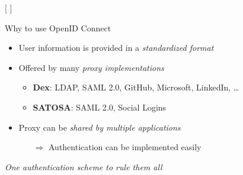 \documentclass[aspectratio=169]{beamer}
\begin{document}
[
	\label{demo}
]

\begin{frame}{Why to use OpenID Connect}
	\begin{itemize}
		\item User information is provided in a \emph{standardized format}
		\pause
		\item Offered by many \emph{proxy implementations}
		\begin{itemize}
			\item \textbf{Dex}: LDAP, SAML 2.0, GitHub, Microsoft, LinkedIn, \dots
			\item \textbf{SATOSA}: SAML 2.0, Social Logins
		\end{itemize}
		\pause
		\item Proxy can be \emph{shared by multiple applications}
		\begin{itemize}
			\item[$\Rightarrow$] Authentication can be implemented easily 
		\end{itemize}
	\end{itemize}
	\vspace{3em}
	\pause
	\centering \emph{\large One authentication scheme to rule them all}
\end{frame}
\end{document}

